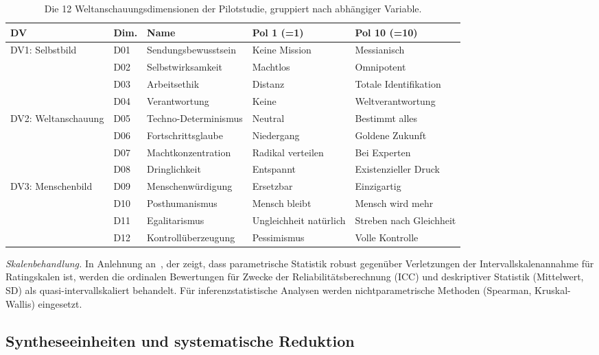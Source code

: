 \documentclass[11pt,a4paper]{article}
\begin{document}
\begin{table}[htbp]
  \centering
  \caption{Die 12 Weltanschauungsdimensionen der Pilotstudie, gruppiert nach abhängiger Variable.}
  \label{tab:dimensions}
  \small
  \setlength{\tabcolsep}{4pt}
  \begin{tabular}{@{} l l l l l @{}}
    \toprule
    \textbf{DV} & \textbf{Dim.} & \textbf{Name} & \textbf{Pol 1 (=1)} & \textbf{Pol 10 (=10)} \\
    \midrule
    \multirow{4}{*}{DV1: Selbstbild}
    & D01 & Sendungsbewusstsein & Keine Mission & Messianisch \\
    & D02 & Selbstwirksamkeit & Machtlos & Omnipotent \\
    & D03 & Arbeitsethik & Distanz & Totale Identifikation \\
    & D04 & Verantwortung & Keine & Weltverantwortung \\
    \midrule
    \multirow{4}{*}{DV2: Weltanschauung}
    & D05 & Techno-Determinismus & Neutral & Bestimmt alles \\
    & D06 & Fortschrittsglaube & Niedergang & Goldene Zukunft \\
    & D07 & Machtkonzentration & Radikal verteilen & Bei Experten \\
    & D08 & Dringlichkeit & Entspannt & Existenzieller Druck \\
    \midrule
    \multirow{4}{*}{DV3: Menschenbild}
    & D09 & Menschenwürdigung & Ersetzbar & Einzigartig \\
    & D10 & Posthumanismus & Mensch bleibt & Mensch wird mehr \\
    & D11 & Egalitarismus & Ungleichheit natürlich & Streben nach Gleichheit \\
    & D12 & Kontrollüberzeugung & Pessimismus & Volle Kontrolle \\
    \bottomrule
  \end{tabular}
\end{table}

\emph{Skalenbehandlung.} In Anlehnung an~\citet{Norman2010}, der zeigt, dass parametrische Statistik robust gegenüber Verletzungen der Intervallskalenannahme für Ratingskalen ist, werden die ordinalen Bewertungen für Zwecke der Reliabilitätsberechnung (ICC) und deskriptiver Statistik (Mittelwert, SD) als quasi-intervallskaliert behandelt. Für inferenzstatistische Analysen werden nichtparametrische Methoden (Spearman, Kruskal-Wallis) eingesetzt.


\subsection{Syntheseeinheiten und systematische Reduktion}
\label{sec:method:su}
\end{document}
